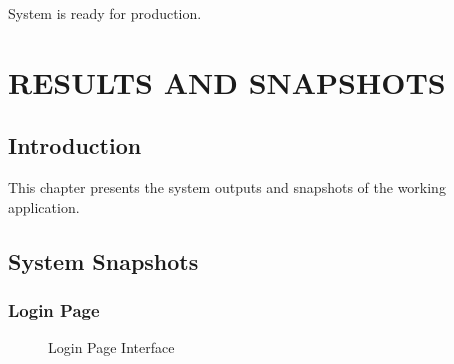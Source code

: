\documentclass[12pt,a4paper,twoside]{book}
\begin{document}
System is ready for production.

\chapter{RESULTS AND SNAPSHOTS}

\section{Introduction}

This chapter presents the system outputs and snapshots of the working application.

\section{System Snapshots}

\subsection{Login Page}
\begin{figure}[H]
\centering
{}
\caption{Login Page Interface}
\end{figure}
\end{document}
